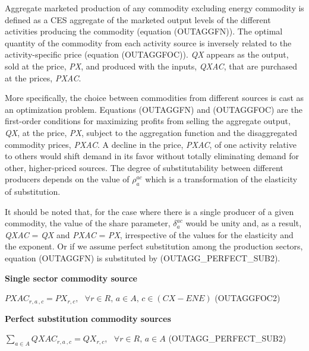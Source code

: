 \documentclass[10pt,a4paper,titlepage,dvipdfmx]{book}
\begin{document}
Aggregate marketed production of any commodity excluding energy commodity is defined as a CES aggregate of the marketed output levels of the different activities producing the commodity (equation (OUTAGGFN)). The optimal quantity of the commodity from each activity source is inversely related to the activity-specific price (equation (OUTAGGFOC)). \textit{QX} appears as the output, sold at the price, \textit{PX}, and produced with the inputs, \textit{QXAC}, that are purchased at the prices, \textit{PXAC}.

More specifically, the choice between commodities from different sources is cast as an optimization problem. Equations (OUTAGGFN) and (OUTAGGFOC) are the first-order conditions for maximizing profits from selling the aggregate output, \textit{QX}, at the price, \textit{PX}, subject to the aggregation function and the disaggregated commodity prices, \textit{PXAC}. A decline in the price, \textit{PXAC}, of one activity relative to others would shift demand in its favor without totally eliminating demand for other, higher-priced sources. The degree of substitutability between different producers depends on the value of $\rho _{a}^{ac}$ which is a transformation of the elasticity of substitution. 

It should be noted that, for the case where there is a single producer of a given commodity, the value of the share parameter, $\delta _{a}^{ac}$ would be unity and, as a result, \textit{QXAC} = \textit{QX} and \textit{PXAC} = \textit{PX}, irrespective of the values for the elasticity and the exponent. Or if we assume perfect substitution among the production sectors, equation (OUTAGGFN) is substituted by (OUTAGG\_PERFECT\_SUB2).

\begin{flushleft}\textbf{Single sector commodity source}\end{flushleft}


\begin{center}$PXAC_{r,a\,,c}=PX_{r,c},\,\,\,\,\forall r\in R,\,a\in A,\,c\in \left(CX-ENE\right)$ (OUTAGGFOC2)
\end{center}

\begin{flushleft}\textbf{Perfect substitution commodity sources}\end{flushleft}


\begin{center}$\sum _{a\in A}QXAC_{r,a\,,c}=QX_{r,c},\,\,\,\,\forall r\in R,\,a\in A$ (OUTAGG\_PERFECT\_SUB2)
\end{center}
\end{document}
